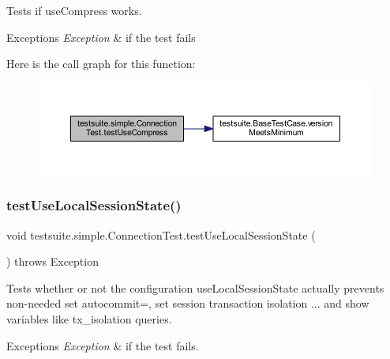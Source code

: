 Tests if use\+Compress works.


\begin{DoxyExceptions}{Exceptions}
{\em Exception} & if the test fails \\
\hline
\end{DoxyExceptions}
Here is the call graph for this function\+:
\nopagebreak
\begin{figure}[H]
\begin{center}
\leavevmode
\includegraphics[width=350pt]{classtestsuite_1_1simple_1_1_connection_test_ab5c3f7762742c5135e360e5ad11f59e5_cgraph}
\end{center}
\end{figure}
\mbox{\label{classtestsuite_1_1simple_1_1_connection_test_abaf8e563e167bfb40021b103f3cccd70}} 
\subsubsection{\texorpdfstring{test\+Use\+Local\+Session\+State()}{testUseLocalSessionState()}}
{\footnotesize\ttfamily void testsuite.\+simple.\+Connection\+Test.\+test\+Use\+Local\+Session\+State (\begin{DoxyParamCaption}{ }\end{DoxyParamCaption}) throws Exception}

Tests whether or not the configuration \textquotesingle{}use\+Local\+Session\+State\textquotesingle{} actually prevents non-\/needed \textquotesingle{}set autocommit=\textquotesingle{}, \textquotesingle{}set session transaction isolation ...\textquotesingle{} and \textquotesingle{}show variables like tx\+\_\+isolation\textquotesingle{} queries.


\begin{DoxyExceptions}{Exceptions}
{\em Exception} & if the test fails. \\
\hline
\end{DoxyExceptions}
\mbox{\label{classtestsuite_1_1simple_1_1_connection_test_a0c148553019aa296f7f80dfc7edf1e49}} 
